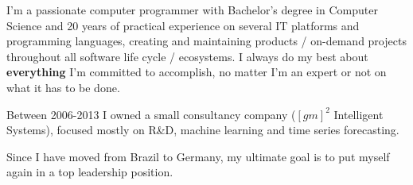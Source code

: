 
\begin{cvparagraph}
I’m a passionate computer programmer with Bachelor’s degree in Computer Science and 20 years
of practical experience on several IT platforms and programming languages, creating and maintaining
products / on-demand projects throughout all software life cycle / ecosystems.
I always do my best about \textbf{everything} I’m committed to accomplish, no matter I’m an expert
or not on what it has to be done.

Between 2006-2013 I owned a small consultancy company
($[gm]^2$ Intelligent Systems), focused mostly on R\&D, machine learning and time series forecasting.

Since I have moved from Brazil to Germany, my ultimate goal is to put myself again in a top leadership position.

\end{cvparagraph}
